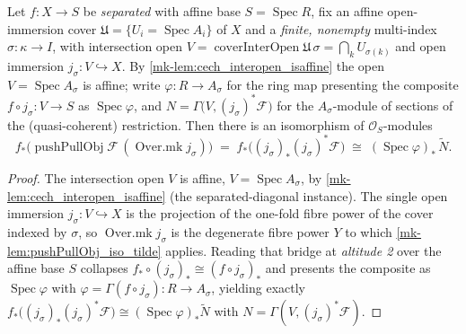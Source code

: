 \begin{lemma}\label{mk-lem:coverinter_lhs_iso_tilde}
  \leanok

  Let \(f : X \to S\) be \emph{separated} with affine base \(S = \operatorname{Spec} R\), fix an
  affine open-immersion cover \(\mathfrak{U} = \{U_i = \operatorname{Spec} A_i\}\) of \(X\) and a
  \emph{finite, nonempty} multi-index \(\sigma : \kappa \to I\), with intersection open
  \(V = \operatorname{coverInterOpen}\mathfrak{U}\,\sigma = \bigcap_k U_{\sigma(k)}\) and open
  immersion \(j_\sigma : V \hookrightarrow X\). By \ref{mk-lem:cech_interopen_isaffine} the open
  \(V = \operatorname{Spec} A_\sigma\) is affine; write \(\varphi : R \to A_\sigma\) for the ring
  map presenting the composite \(f \circ j_\sigma : V \to S\) as \(\operatorname{Spec}\varphi\),
  and \(N = \Gamma\bigl(V, (j_\sigma)^*\mathcal{F}\bigr)\) for the \(A_\sigma\)-module of sections
  of the (quasi-coherent) restriction. Then there is an isomorphism of
  \(\mathcal{O}_S\)-modules
  \[
    f_*\bigl(\operatorname{pushPullObj}\mathcal{F}\,(\operatorname{Over.mk} j_\sigma)\bigr)
      \;=\; f_*\bigl((j_\sigma)_* (j_\sigma)^*\mathcal{F}\bigr)
      \;\cong\; (\operatorname{Spec}\varphi)_*\,\widetilde{N}.
  \]
\end{lemma}
\begin{proof}
  The intersection open \(V\) is affine, \(V = \operatorname{Spec} A_\sigma\), by
  \ref{mk-lem:cech_interopen_isaffine} (the separated-diagonal instance). The single open
  immersion \(j_\sigma : V \hookrightarrow X\) is the projection of the one-fold fibre power of
  the cover indexed by \(\sigma\), so \(\operatorname{Over.mk} j_\sigma\) is the degenerate fibre
  power \(Y\) to which \ref{mk-lem:pushPullObj_iso_tilde} applies. Reading that bridge at
  \emph{altitude 2} over the affine base \(S\) collapses
  \(f_* \circ (j_\sigma)_* \cong (f \circ j_\sigma)_*\) and presents the composite as
  \(\operatorname{Spec}\varphi\) with \(\varphi = \Gamma(f \circ j_\sigma) : R \to A_\sigma\),
  yielding exactly
  \(f_*\bigl((j_\sigma)_*(j_\sigma)^*\mathcal{F}\bigr) \cong
  (\operatorname{Spec}\varphi)_*\widetilde{N}\) with
  \(N = \Gamma(V, (j_\sigma)^*\mathcal{F})\).
\end{proof}

